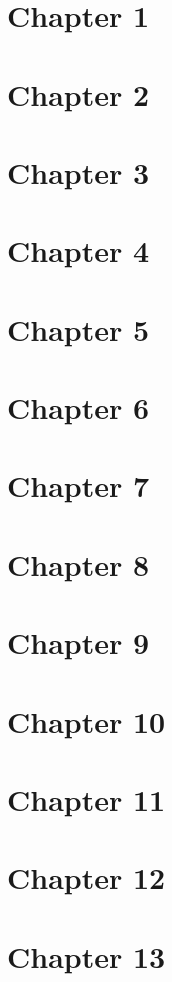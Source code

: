 \documentclass[12pt]{article}
\begin{document}
\section{Chapter 1}\newpage
\section{Chapter 2}\newpage
\section{Chapter 3}\newpage
\section{Chapter 4}\newpage
\section{Chapter 5}\newpage
\section{Chapter 6}\newpage
\section{Chapter 7}\newpage
\section{Chapter 8}\newpage
\section{Chapter 9}\newpage
\section{Chapter 10}\newpage
\section{Chapter 11}\newpage
\section{Chapter 12}\newpage
\section{Chapter 13}\newpage
\end{document}
